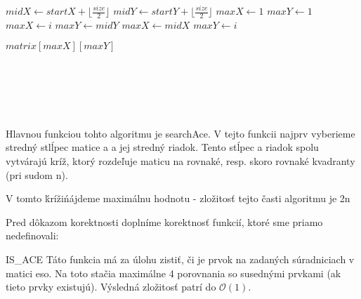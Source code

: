 \documentclass[paper=a4, fontsize=11pt]{scrartcl} %
\numberwithin{equation}{section} %
\numberwithin{figure}{section} %
\numberwithin{table}{section} %
\begin{document}
\begin{algorithmic}[1]
        \State $midX \gets startX + \lfloor \frac{size}{2} \rfloor$
	\State $midY \gets startY + \lfloor \frac{size}{2} \rfloor$
	\State $maxX \gets 1$
	\State $maxY \gets 1$
			\State $maxX \gets i$
			\State $maxY \gets midY$
		\EndIf
	\EndFor
			\State $maxX \gets midX$
			\State $maxY \gets i$
		\EndIf
	\EndFor

	
		\State \Return $matrix[maxX][maxY]$
	\EndIf
		
		\State {}
		\State {}
		\State {}
		\State {}
	\EndIf

	
    \EndFunction
\\
\\
		\State {}
	\EndFunction
\\
\\
         \State {}
    \EndFunction
\end{algorithmic}


Hlavnou funkciou tohto algoritmu je searchAce.
V tejto funkcii najprv vyberieme stredný stlĺpec matice a a jej stredný riadok.
Tento stĺpec a riadok spolu vytvárajú kríž, ktorý rozdeľuje maticu na rovnaké, resp. skoro rovnaké kvadranty (pri sudom n).

V tomto \'kríži\' nájdeme maximálnu hodnotu - zložitosť tejto časti algoritmu je 2n

Pred dôkazom korektnosti doplníme korektnosť funkcií, ktoré sme priamo nedefinovali:

IS\_ACE
Táto funkcia má za úlohu zistiť, či je prvok na zadaných súradniciach v matici eso. Na toto stačia maximálne 4 porovnania so susednými prvkami (ak tieto prvky existujú).
Výsledná zložitosť patrí do $\mathcal{O}(1)$.
\end{document}
